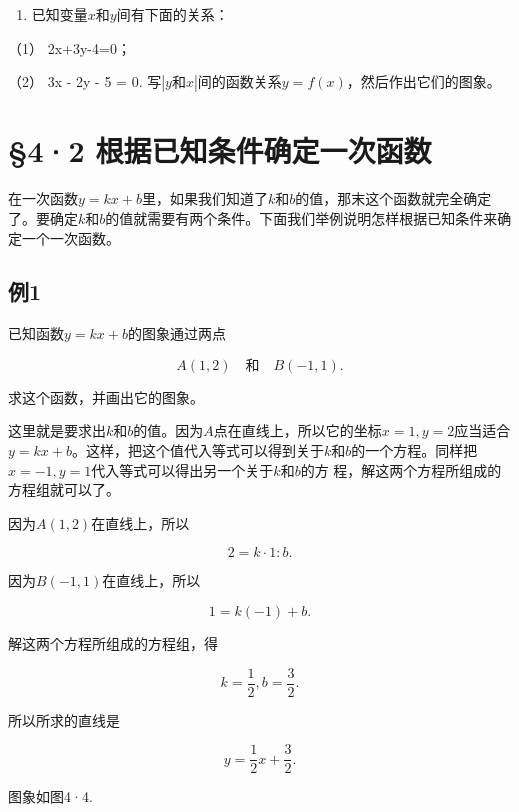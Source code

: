 \begin{enumerate}[start=5]
\item
  已知变量\(x\)和\(y\)间有下面的关系：
\end{enumerate}

（1） 2x+3y-4=0；

（2） 3x - 2y - 5 = 0.
写\(\left| {y\text{和}x}\right|\)间的函数关系\(y = f\left( x\right)\)，然后作出它们的图象。

\section{§4·2 根据已知条件确定一次函数}

在一次函数\(y = kx + b\)里，如果我们知道了\(k\)和\(b\)的值，那末这个函数就完全确定了。要确定\(k\)和\(b\)的值就需要有两个条件。下面我们举例说明怎样根据已知条件来确定一个一次函数。

\subsection{例1}

已知函数\(y = kx + b\)的图象通过两点

\[
A (1, 2) \quad \text{和} \quad B (- 1, 1).
\]

求这个函数，并画出它的图象。

这里就是要求出\(k\)和\(b\)的值。因为\(A\)点在直线上，所以它的坐标\(x = 1, y = 2\)应当适合\(y = kx + b\)。这样，把这个值代入等式可以得到关于\(k\)和\(b\)的一个方程。同样把\(x = -1, y = 1\)代入等式可以得出另一个关于\(k\)和\(b\)的方
程，解这两个方程所组成的方程组就可以了。

 因为\(A(1,2)\)在直线上，所以

\[
2 = k \cdot 1: b. \tag {1}
\]

因为\(B(-1, 1)\)在直线上，所以

\[
1 = k (- 1) + b. \tag {2}
\]

解这两个方程所组成的方程组，得

\[
k = \frac{1}{2}, b = \frac{3}{2}.
\]

所以所求的直线是

\[
y = \frac{1}{2} x + \frac{3}{2}.
\]

图象如图4·4.


